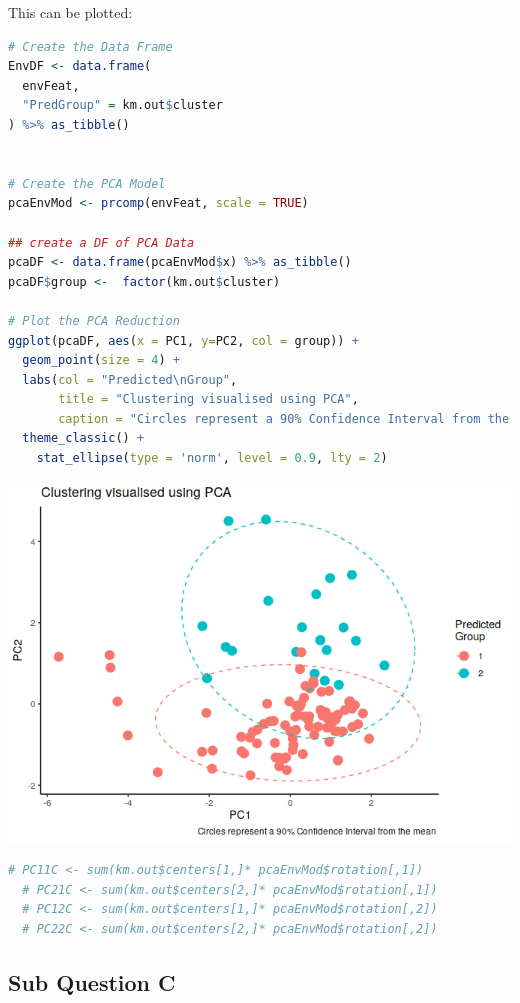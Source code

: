 \documentclass[
]{article}
\begin{document}
This can be plotted:

\begin{lstlisting}[language=R]
# Create the Data Frame
EnvDF <- data.frame(
  envFeat,
  "PredGroup" = km.out$cluster
) %>% as_tibble()


# Create the PCA Model
pcaEnvMod <- prcomp(envFeat, scale = TRUE)

## create a DF of PCA Data
pcaDF <- data.frame(pcaEnvMod$x) %>% as_tibble()
pcaDF$group <-  factor(km.out$cluster)

# Plot the PCA Reduction
ggplot(pcaDF, aes(x = PC1, y=PC2, col = group)) +
  geom_point(size = 4) +
  labs(col = "Predicted\nGroup",
       title = "Clustering visualised using PCA",
       caption = "Circles represent a 90% Confidence Interval from the mean ") +
  theme_classic() +
    stat_ellipse(type = 'norm', level = 0.9, lty = 2) 
\end{lstlisting}

\includegraphics{FinalExam_files/figure-html/unnamed-chunk-5-1.png}

\begin{lstlisting}[language=R]
  # PC11C <- sum(km.out$centers[1,]* pcaEnvMod$rotation[,1])
  # PC21C <- sum(km.out$centers[2,]* pcaEnvMod$rotation[,1])
  # PC12C <- sum(km.out$centers[1,]* pcaEnvMod$rotation[,2])
  # PC22C <- sum(km.out$centers[2,]* pcaEnvMod$rotation[,2])
\end{lstlisting}

\hypertarget{sub-question-c}{%
\subsection{Sub Question C}\label{sub-question-c}}
\end{document}
